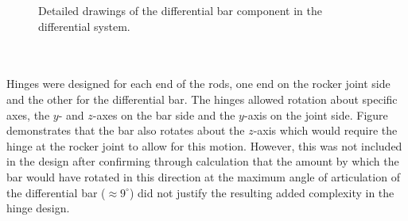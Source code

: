         \begin{figure}[h!]
        \centering
        \caption[Detailed drawings of the differential bar component in the differential system.]{Detailed drawings of the differential bar component in the differential system.}
        \label{fig:mechDesign-differentialBarDetail}
        \end{figure}
        
        
      \\\\
        Hinges were designed for each end of the rods, one end on the rocker joint side and the other for the differential bar. The hinges allowed rotation about specific axes, the $y$- and $z$-axes on the bar side and the $y$-axis on the joint side. Figure~ demonstrates that the bar also rotates about the $z$-axis which would require the hinge at the rocker joint to allow for this motion. However, this was not included in the design after confirming through calculation that the amount by which the bar would have rotated in this direction at the maximum angle of articulation of the differential bar ($\approx9^\circ$) did not justify the resulting added complexity in the hinge design.
        
